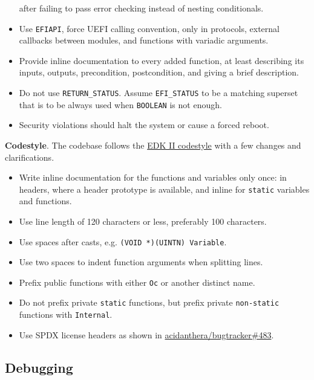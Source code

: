 \documentclass[]{article}
\makeatletter
\providecommand{\tightlist}{%
  \setlength{\itemsep}{0pt}\setlength{\parskip}{0pt}}
\renewcommand{\label}[1]{%
\zref@wrapper@immediate{\oldlabel{#1}}}  %
\makeatother
\begin{document}
\begin{itemize}
after failing to pass error checking instead of nesting conditionals.
\item Use \texttt{EFIAPI}, force UEFI calling convention, only in protocols, external callbacks between
modules, and functions with variadic arguments.
\item Provide inline documentation to every added function, at least describing its inputs, outputs,
precondition, postcondition, and giving a brief description.
\item Do not use \texttt{RETURN\_STATUS}. Assume \texttt{EFI\_STATUS} to be a matching superset that is
to be always used when \texttt{BOOLEAN} is not enough.
\item Security violations should halt the system or cause a forced reboot.
\end{itemize}

\textbf{Codestyle}. The codebase follows the
\href{https://github.com/tianocore/tianocore.github.io/wiki/Code-Style-C}{EDK II codestyle}
with a few changes and clarifications.
\begin{itemize}
\tightlist
\item Write inline documentation for the functions and variables only once: in headers, where a header prototype
is available, and inline for \texttt{static} variables and functions.
\item Use line length of 120 characters or less, preferably 100 characters.
\item Use spaces after casts, e.g. \texttt{(VOID *)(UINTN) Variable}.
\item Use two spaces to indent function arguments when splitting lines.
\item Prefix public functions with either \texttt{Oc} or another distinct name.
\item Do not prefix private \texttt{static} functions, but prefix private \texttt{non-static} functions with \texttt{Internal}.
\item Use SPDX license headers as shown in
\href{https://github.com/acidanthera/bugtracker/issues/483}{acidanthera/bugtracker\#483}.
\end{itemize}

\subsection{Debugging}\label{configuration-debug}
\end{document}
